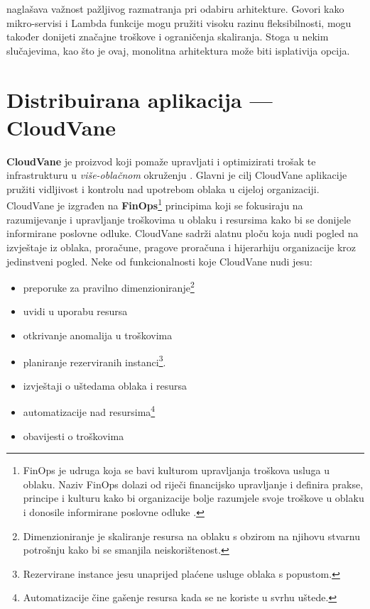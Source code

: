 \documentclass[times, utf8, diplomski]{fer}
\begin{document}
\citet{kolny_scaling_2023} naglašava važnost pažljivog razmatranja pri odabiru arhitekture. Govori kako mikro-servisi i Lambda funkcije mogu pružiti visoku razinu fleksibilnosti, mogu također donijeti značajne troškove i ograničenja skaliranja. Stoga u nekim slučajevima, kao što je ovaj, monolitna arhitektura može biti isplativija opcija.



\chapter{Distribuirana aplikacija --- CloudVane}
\label{sec:cloudvane}

\textbf{CloudVane} je proizvod koji pomaže upravljati i optimizirati trošak te infrastrukturu u \emph{više-oblačnom}  okruženju  \citep{neos_cloudvane_2023}. Glavni je cilj CloudVane aplikacije pružiti vidljivost i kontrolu nad upotrebom oblaka  u cijeloj organizaciji. \\

CloudVane je izgrađen na \textbf{FinOps}\footnote{FinOps je udruga koja se bavi kulturom upravljanja troškova usluga u oblaku. Naziv FinOps dolazi od riječi financijsko upravljanje  i definira prakse, principe i kulturu kako bi organizacije bolje razumjele svoje troškove u oblaku i donosile informirane poslovne odluke \citep{finops_fundation_finops_nodate}.} principima koji se fokusiraju na razumijevanje i upravljanje troškovima u oblaku i resursima kako bi se donijele informirane poslovne odluke. CloudVane sadrži alatnu ploču  koja nudi pogled na izvještaje iz oblaka, proračune, pragove proračuna i hijerarhiju organizacije kroz jedinstveni pogled.
Neke od funkcionalnosti koje CloudVane nudi jesu:

\begin{itemize} 
\item preporuke za pravilno dimenzioniranje\footnote{Dimenzioniranje je skaliranje resursa na oblaku s obzirom na njihovu stvarnu potrošnju kako bi se smanjila neiskorištenost.}
\item uvidi u uporabu resursa
\item otkrivanje anomalija u troškovima
\item planiranje rezerviranih instanci\footnote{Rezervirane instance  jesu unaprijed plaćene usluge oblaka s popustom.}.
\item izvještaji o uštedama oblaka i resursa
\item automatizacije nad resursima\footnote{Automatizacije čine gašenje resursa kada se ne koriste u svrhu uštede.}
\item obavijesti o troškovima
\end{itemize}
\end{document}
